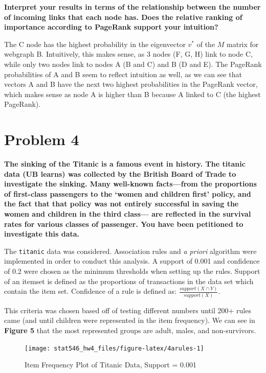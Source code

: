 \documentclass[]{article}
\begin{document}
\textbf{Interpret your results in terms of the relationship between the
number of incoming links that each node has. Does the relative ranking
of importance according to PageRank support your intuition?}

The C node has the highest probability in the eigenvector \(v^{*}\) of
the \(M\) matrix for webgraph B. Intuitively, this makes sense, as 3
nodes (F, G, H) link to node C, while only two nodes link to nodes A (B
and C) and B (D and E). The PageRank probabilities of A and B seem to
reflect intuition as well, as we can see that vectors A and B have the
next two highest probabilities in the PageRank vector, which makes sense
as node A is higher than B because A linked to C (the highest PageRank).

\newpage 

\section{Problem 4}\label{problem-4}

\textbf{The sinking of the Titanic is a famous event in history. The
titanic data (UB learns) was collected by the British Board of Trade to
investigate the sinking. Many well-known facts---from the proportions of
first-class passengers to the `women and children first' policy, and the
fact that that policy was not entirely successful in saving the women
and children in the third class--- are reflected in the survival rates
for various classes of passenger. You have been petitioned to
investigate this data.}

The \texttt{titanic} data was considered. Association rules and
\textit{a priori} algorithm were implemented in order to conduct this
analysis. A support of 0.001 and confidence of 0.2 were chosen as the
minimum thresholds when setting up the rules. Support of an itemset is
defined as the proportions of transactions in the data set which contain
the item set. Confidence of a rule is defined as:
\(\frac{support(X \cap Y)}{support(X)}\).

This criteria was chosen based off of testing different numbers until
200+ rules came (and until children were represented in the item
frequency). We can see in \textbf{Figure 5} that the most represented
groups are adult, males, and non-survivors.

\begin{figure}[h]

{\centering \texttt{[image: stat546\_hw4\_files/figure-latex/4arules-1]} 

}

\caption{Item Frequency Plot of Titanic Data, Support = 0.001}\label{fig:4arules}
\end{figure}
\end{document}
